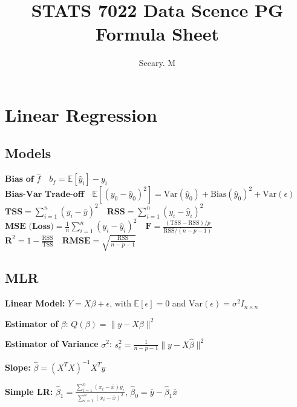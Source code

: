 \documentclass[a4paper,9pt,fleqn]{extarticle}
\begin{document}
\small

\title{STATS 7022 Data Scence PG Formula Sheet}
\author{Secary. M}

\maketitle

\section{Linear Regression}
\noindent
\begin{minipage}[t]{0.45\textwidth}
    \subsection*{Models}
    \begin{flushleft}
    $\textbf{Bias of } \hat{f} \quad b_f = \mathbb{E}[\hat{y}_i] - y_i$ \\[1ex]

    $\textbf{Bias-Var Trade-off} \quad \mathbb{E}[(y_0 - \hat{y}_0)^2] = \mathrm{Var}(\hat{y}_0) + \mathrm{Bias}(\hat{y}_0)^2 + \mathrm{Var}(\epsilon)$ \\[1ex]

    $\textbf{TSS} = \sum_{i = 1}^{n}(y_i - \bar{y})^2 \quad 
    \textbf{RSS} = \sum_{i = 1}^{n}(y_i - \hat{y}_i)^2$ \\[1ex]

    $\textbf{MSE (Loss)} = \frac{1}{n} \sum_{i = 1}^{n}(y_i - \hat{y}_i)^2 \quad
    \textbf{F} = \frac{(\mathrm{TSS} - \mathrm{RSS}) / p}{\mathrm{RSS} / (n - p - 1)}$ \\[1ex]

    $\textbf{R}^2 = 1 - \frac{\mathrm{RSS}}{\mathrm{TSS}} \quad
    \textbf{RMSE} = \sqrt{\frac{\mathrm{RSS}}{n - p - 1}}$
    \end{flushleft}
\end{minipage}
\hspace{0.05\textwidth}
\begin{minipage}[t]{0.45\textwidth}
\raggedright
\subsection*{MLR}
\begin{flushleft}
\textbf{Linear Model: } $Y = X\beta + \epsilon$, with $\mathbb{E}[\epsilon] = 0$ and $\text{Var}(\epsilon) = \sigma^2 I_{n \times n}$

\vspace{1ex}
\textbf{Estimator of } $\beta$: $Q(\beta) = \| y - X\beta \|^2$

\vspace{1ex}
\textbf{Estimator of Variance } $\sigma^2$: $s_e^2 = \frac{1}{n - p - 1} \| y - X\hat{\beta} \|^2$

\vspace{1ex}
\textbf{Slope: } $\hat{\beta} = (X^TX)^{-1}X^Ty$

\vspace{1ex}
\textbf{Simple LR: } $\hat{\beta}_1 = \frac{\sum_{i=1}^{n}(x_i - \bar{x})y_i}{\sum_{i=1}^{n}(x_i - \bar{x})^2}$, \quad $\hat{\beta}_0 = \bar{y} - \hat{\beta}_1 \bar{x}$
\end{flushleft}
\end{minipage}
\end{document}
